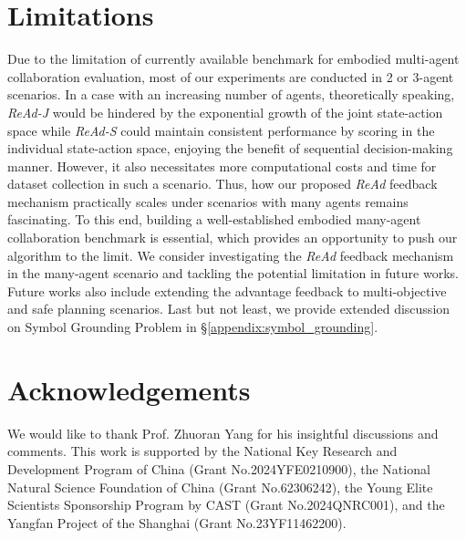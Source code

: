 \documentclass[11pt]{article}
\theoremstyle{plain}
\theoremstyle{remark}
\begin{document}
\section*{Limitations}
Due to the limitation of currently available benchmark for embodied multi-agent collaboration evaluation, most of our experiments are conducted in 2 or 3-agent scenarios.
In a case with an increasing number of agents, theoretically speaking, \emph{ReAd-J} would be hindered by the exponential growth of the joint state-action space while \emph{ReAd-S} could maintain consistent performance by scoring in the individual state-action space, enjoying the benefit of sequential decision-making manner.
However, it also necessitates more computational costs and time for dataset collection in such a scenario. Thus, how our proposed \emph{ReAd} feedback mechanism practically scales under scenarios with many agents remains fascinating. To this end, building a well-established embodied many-agent collaboration benchmark is essential, which provides an opportunity to push our algorithm to the limit. We consider investigating the \emph{ReAd} feedback mechanism in the many-agent scenario and tackling the potential limitation in future works. Future works also include extending the advantage feedback to multi-objective and safe planning scenarios. Last but not least, we provide extended discussion on Symbol Grounding Problem \citep{harnad1990symbol} in \S\ref{appendix:symbol_grounding}.

\section*{Acknowledgements}
We would like to thank Prof. Zhuoran Yang for his insightful discussions and comments. This work is supported by the National Key Research and Development Program of China (Grant No.2024YFE0210900), the National Natural Science Foundation of China (Grant No.62306242), the Young Elite Scientists Sponsorship Program by CAST (Grant No.2024QNRC001), and the Yangfan Project of the Shanghai (Grant No.23YF11462200).


\end{document}
